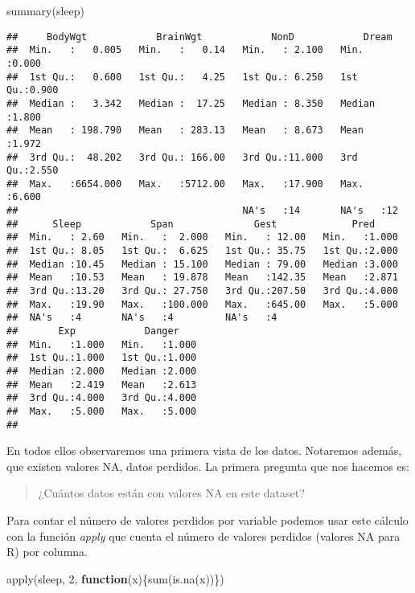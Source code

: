 \documentclass[
]{article}
\newenvironment{Shaded}{\begin{snugshade}}{\end{snugshade}}
\newcommand{\ControlFlowTok}[1]{\textcolor[rgb]{0.13,0.29,0.53}{\textbf{#1}}}
\newcommand{\DecValTok}[1]{\textcolor[rgb]{0.00,0.00,0.81}{#1}}
\newcommand{\FunctionTok}[1]{\textcolor[rgb]{0.00,0.00,0.00}{#1}}
\newcommand{\NormalTok}[1]{#1}
\begin{document}
\begin{Shaded}
\begin{Highlighting}[]
\FunctionTok{summary}\NormalTok{(sleep)}
\end{Highlighting}
\end{Shaded}

\begin{verbatim}
##     BodyWgt            BrainWgt            NonD            Dream      
##  Min.   :   0.005   Min.   :   0.14   Min.   : 2.100   Min.   :0.000  
##  1st Qu.:   0.600   1st Qu.:   4.25   1st Qu.: 6.250   1st Qu.:0.900  
##  Median :   3.342   Median :  17.25   Median : 8.350   Median :1.800  
##  Mean   : 198.790   Mean   : 283.13   Mean   : 8.673   Mean   :1.972  
##  3rd Qu.:  48.202   3rd Qu.: 166.00   3rd Qu.:11.000   3rd Qu.:2.550  
##  Max.   :6654.000   Max.   :5712.00   Max.   :17.900   Max.   :6.600  
##                                       NA's   :14       NA's   :12     
##      Sleep            Span              Gest             Pred      
##  Min.   : 2.60   Min.   :  2.000   Min.   : 12.00   Min.   :1.000  
##  1st Qu.: 8.05   1st Qu.:  6.625   1st Qu.: 35.75   1st Qu.:2.000  
##  Median :10.45   Median : 15.100   Median : 79.00   Median :3.000  
##  Mean   :10.53   Mean   : 19.878   Mean   :142.35   Mean   :2.871  
##  3rd Qu.:13.20   3rd Qu.: 27.750   3rd Qu.:207.50   3rd Qu.:4.000  
##  Max.   :19.90   Max.   :100.000   Max.   :645.00   Max.   :5.000  
##  NA's   :4       NA's   :4         NA's   :4                       
##       Exp            Danger     
##  Min.   :1.000   Min.   :1.000  
##  1st Qu.:1.000   1st Qu.:1.000  
##  Median :2.000   Median :2.000  
##  Mean   :2.419   Mean   :2.613  
##  3rd Qu.:4.000   3rd Qu.:4.000  
##  Max.   :5.000   Max.   :5.000  
## 
\end{verbatim}

En todos ellos observaremos una primera vista de los datos. Notaremos
además, que existen valores NA, datos perdidos. La primera pregunta que
nos hacemos es:

\begin{quote}
¿Cuántos datos están con valores NA en este dataset?
\end{quote}

Para contar el número de valores perdidos por variable podemos usar este
cálculo con la función \emph{apply} que cuenta el número de valores
perdidos (valores NA para R) por columna.

\begin{Shaded}
\begin{Highlighting}[]
\FunctionTok{apply}\NormalTok{(sleep, }\DecValTok{2}\NormalTok{, }\ControlFlowTok{function}\NormalTok{(x)\{}\FunctionTok{sum}\NormalTok{(}\FunctionTok{is.na}\NormalTok{(x))\})}
\end{Highlighting}
\end{Shaded}
\end{document}
